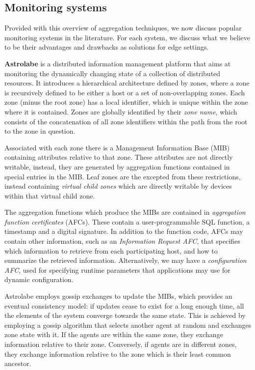 \subsection{Monitoring systems}

Provided with this overview of aggregation techniques, we now discuss popular monitoring systems in the literature. For each system, we discuss what we believe to be their advantages and drawbacks as solutions for edge settings.

\textbf{Astrolabe} \cite{Renesse2003} is a distributed information management platform that aims at monitoring the dynamically changing state of a collection of distributed resources. It introduces a hierarchical architecture defined by zones, where a zone is recursively defined to be either a host or a set of non-overlapping zones. Each zone (minus the root zone) has a local identifier, which is unique within the zone where it is contained. Zones are globally identified by their \textit{zone name}, which consists of the concatenation of all zone identifiers within the path from the root to the zone in question.

Associated with each zone there is a Management Information Base (MIB) containing attributes relative to that zone. These attributes are not directly writable, instead, they are generated by aggregation functions contained in special entries in the MIB. Leaf zones are the excepted from these restrictions, instead containing \textit{virtual child zones} which are directly writable by devices within that virtual child zone.

The aggregation functions which produce the MIBs are contained in \textit{aggregation function certificates} (AFCs). These contain a user-programmable SQL function, a timestamp and a digital signature. In addition to the function code, AFCs may contain other information, such as an \textit{Information Request AFC}, that specifies which information to retrieve from each participating host, and how to summarize the retrieved information. Alternatively, we may have a \textit{configuration AFC}, used for specifying runtime parameters that applications may use for dynamic configuration.

Astrolabe employs gossip exchanges to update the MIBs, which provides an eventual consistency model: if updates cease to exist for a long enough time, all the elements of the system converge towards the same state. This is achieved by employing a gossip algorithm that selects another agent at random and exchanges zone state with it. If the agents are within the same zone, they exchange information relative to their zone. Conversely, if agents are in different zones, they exchange information relative to the zone which is their least common ancestor.


